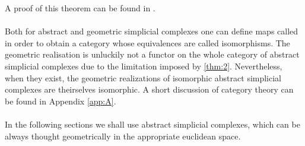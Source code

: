 \documentclass[../1.tex]{subfiles}
\begin{document}
    A proof of this theorem can be found in \cite{comptop}.\\
    \hfill \\
    Both for abstract and geometric simplicial complexes one can define maps called  in order to obtain a category whose
    equivalences are called isomorphisms. The geometric realisation is unluckily not a functor on the whole category of abstract simplicial complexes due to the
    limitation imposed by \autoref{thm:2}. Nevertheless, when they exist, the geometric realizations of isomorphic abstract simplicial complexes are theirselves isomorphic.
    A short discussion of category theory can be found in Appendix \autoref{app:A}.\\
    \hfill \\
    In the following sections we shall use abstract simplicial complexes, which can be always thought geometrically in the appropriate euclidean space.






\end{document}
